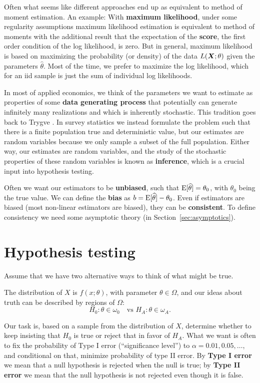 \documentclass[10pt]{article}
\begin{document}
Often what seems like different approaches end up as equivalent to method of moment estimation.
An example: With \textbf{maximum likelihood}, under some regularity assumptions maximum likelihood 
estimation is equivalent to method of moments with the additional result that the expectation 
of the \textbf{score}, the first order condition of the log likelihood, is zero. But in general,
maximum likelihood is based on maximizing the probability (or density) of the data $L(\bm X;\theta)$ 
given the parameters $\widehat{\theta}$. Most of the time, we prefer to maximize the log likelihood,
which for an iid sample is just the sum of individual log likelihoods.

In most of applied economics, we think of the parameters we want to estimate as properties
of some \textbf{data generating process} that potentially can generate infinitely many realizations and
which is inherently stochastic. This tradition goes back to Trygve \citet{Haavelmo1944}.
In survey statistics we instead formulate the problem such that there is a finite population true and
deterministic value, but our estimates are random variables because we only sample a subset of the
full population. Either way, our estimates are random variables, and the study of the stochastic
properties of these random variables is known as \textbf{inference}, which is a crucial input
into hypothesis testing. 

Often we want our estimators to be \textbf{unbiased}, such that
$\operatorname{E}[\widehat{\theta}]=\theta_0$, with $\theta_0$ being the true value. We can
define the \textbf{bias} as $b=\operatorname{E}[\widehat{\theta}] -\theta_0$. Even if
estimators are biased (most non-linear estimators are biased), they can be
\textbf{consistent}. To define consistency we need some asymptotic theory (in
Section~\ref{sec:asymptotics}).

\section{Hypothesis testing}
Assume that we have two alternative ways to think of what might
be true.

The distribution of $X$ is $f(x;\theta)$, with parameter
$\theta\in\Omega$, and our ideas about truth can be described by
regions of $\Omega$:
\[ H_0: \theta\in\omega_0 \quad \text{vs $H_{\!A}: \theta\in\omega_A$.}
\]

Our task is, based on a sample from the distribution of $X$, determine
whether to keep insisting that $H_0$ is true or reject that in favor of
$H_{\!A}$. What we want is often to fix the probability of Type I error
(``significance level'') to $\alpha=0.01,0.05,\dots$, and conditional
on that, minimize probability of type II error. By \textbf{Type I error} we mean that
a null hypothesis is rejected when the null is true; by \textbf{Type II error} we mean
that the null hypothesis is not rejected even though it is false.
\end{document}
